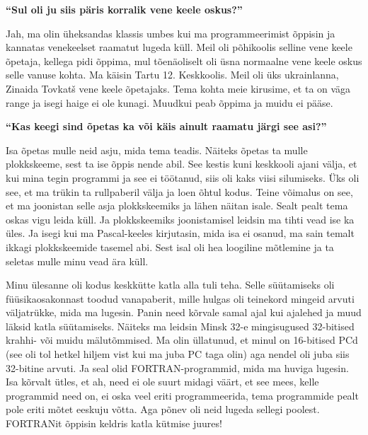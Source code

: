 \textbf{\enquote{Sul oli ju siis päris korralik vene keele oskus?}}

Jah, ma olin üheksandas klassis umbes kui ma programmeerimist õppisin ja kannatas venekeelset raamatut lugeda küll. Meil oli põhikoolis selline vene keele õpetaja, kellega pidi õppima, mul tõenäoliselt oli üsna normaalne vene keele oskus selle vanuse kohta. Ma käisin Tartu 12. Keskkoolis. Meil oli üks ukrainlanna, Zinaida Tovkatš vene keele õpetajaks. Tema kohta meie kirusime, et ta on väga range ja isegi haige ei ole kunagi. Muudkui peab õppima ja muidu ei pääse. 

\textbf{\enquote{Kas keegi sind õpetas ka või käis ainult raamatu järgi see asi?}}

Isa õpetas mulle neid asju, mida tema teadis. Näiteks õpetas ta mulle plokkskeeme, sest ta ise õppis nende abil. See kestis kuni keskkooli ajani välja, et kui mina tegin programmi ja see ei töötanud, siis oli kaks viisi silumiseks. Üks oli see, et ma trükin ta rullpaberil välja ja loen õhtul kodus. Teine võimalus on see, et ma joonistan selle asja plokkskeemiks ja lähen näitan isale. Sealt pealt tema oskas vigu leida küll. Ja plokkskeemiks joonistamisel leidsin ma tihti vead ise ka üles. Ja isegi kui ma Pascal-keeles kirjutasin, mida isa ei osanud, ma sain temalt ikkagi plokkskeemide tasemel abi. Sest isal oli hea loogiline mõtlemine ja ta seletas mulle minu vead ära küll. 

Minu ülesanne oli kodus keskkütte katla alla tuli teha. Selle süütamiseks oli füüsikaosakonnast toodud vanapaberit, mille hulgas oli teinekord mingeid arvuti väljatrükke, mida ma lugesin. Panin need kõrvale samal ajal kui ajalehed ja muud läksid katla süütamiseks. Näiteks ma leidsin Minsk 32-e mingisugused 32-bitised krahhi- või muidu mälutõmmised. Ma olin üllatunud, et minul on 16-bitised PCd (see oli tol hetkel hiljem vist kui ma juba PC taga olin) aga nendel oli juba siis 32-bitine arvuti. Ja seal olid FORTRAN-programmid, mida ma huviga lugesin. Isa kõrvalt ütles, et ah, need ei ole suurt midagi väärt, et see mees, kelle programmid need on, ei oska veel eriti programmeerida, tema programmide pealt pole eriti mõtet eeskuju võtta. Aga põnev oli neid lugeda sellegi poolest. FORTRANit õppisin keldris katla kütmise juures!

